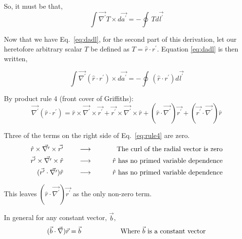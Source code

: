 \documentclass[12pt]{article}
\begin{document}
\begin{flushleft}
So, it must be that,
\begin{equation}
\int \vec{\nabla^{\prime}} T \times  d\vec{a^{\prime}}  = - \oint \,T  d\vec{l^{\prime}}
\label{eq:dadl}
\end{equation}

Now that we have Eq.~\ref{eq:dadl}, for the second part of this derivation, let our heretofore arbitrary scalar $T$ be defined as $T=\hat{r} \cdot r^{\prime}$.  Equation \ref{eq:dadl} is then written,

\begin{equation}
\int \vec{\nabla^{\prime}}(\hat{r} \cdot r^{\prime}) \times  d\vec{a^{\prime}}  = - \oint \,(\hat{r} \cdot r^{\prime}) d\vec{l^{\prime}}
\label{eq:almostthere}
\end{equation}

By product rule 4 (front cover of Griffiths):
\begin{equation}
\vec{\nabla^{\prime}}(\hat{r} \cdot r^{\prime}) = \hat{r}\times\vec{\nabla^{\prime}}\times\vec{r^{\prime}} + \vec{r^{\prime}} \times \vec{\nabla^{\prime}} \times \hat{r} + ( \hat{r} \cdot \vec{\nabla^{\prime}} )\vec{r^{\prime}} + (\vec{r^{\prime}} \cdot \vec{\nabla^{\prime}} )\hat{r}
\label{eq:rule4}
\end{equation}

Three of the terms on the right side of Eq.~\ref{eq:rule4} are zero.
\begin{eqnarray*}
 \hat{r}\times\vec{\nabla^{\prime}}\times\vec{r^{\prime}} \hspace{.3in} & \longrightarrow  & \hspace{.3in} \text{The curl of the radial vector is zero} \\
 \vec{r^{\prime}} \times \vec{\nabla^{\prime}} \times \hat{r} \hspace{.3in} &  \longrightarrow  & \hspace{.3in} \text{$\hat{r}$ has no primed variable dependence} \\
(\vec{r^{\prime}} \cdot \vec{\nabla^{\prime}} )\hat{r} \hspace{.3in} &  \longrightarrow  & \hspace{.3in} \text{$\hat{r}$ has no primed variable dependence}  
 \end{eqnarray*}
 
 This leaves $( \hat{r} \cdot \vec{\nabla^{\prime}} )\vec{r^{\prime}}$ as the only non-zero term.
\vspace{.1in} 

 In general for any constant vector, $\vec{b}$, 
 \begin{equation}
 ( \vec{b}\cdot \vec{\nabla} ) \vec{r} = \vec{b}  \hspace{.8in} \text{Where $\vec{b}$ is a constant vector}
 \label{eq:constantvectrelation} 
\end{equation}
 

\end{flushleft}
\end{document}
